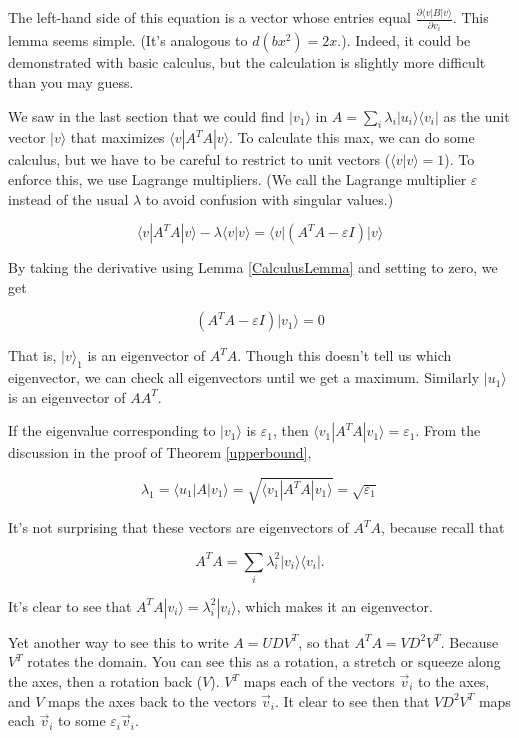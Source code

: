 \documentclass{amsbook}
\begin{document}
The left-hand side of this equation is a vector whose entries equal $\frac{\partial\langle v|B|v\rangle}{\partial v_i}$.  This lemma seems simple.  (It's analogous to $d(bx^2)=2x$.). Indeed, it could be demonstrated with basic calculus, but the calculation is slightly more difficult than you may guess.

We saw in the last section that we could find $|v_1\rangle$ in $A=\sum_i\lambda_i|u_i\rangle\langle v_i|$ as the unit vector $|v\rangle$ that maximizes $\langle v|A^TA|v\rangle$.  To calculate this max, we can do some calculus, but we have to be careful to restrict to unit vectors ($\langle v|v\rangle=1$).  To enforce this, we use Lagrange multipliers.  (We call the Lagrange multiplier $\varepsilon$ instead of the usual $\lambda$ to avoid confusion with singular values.)

$$
\langle v|A^TA|v\rangle-\lambda\langle v|v\rangle=\langle v|\left(A^TA-\varepsilon I\right)|v\rangle
$$

By taking the derivative using Lemma \ref{CalculusLemma} and setting to zero, we get

$$
\left(A^TA-\varepsilon I\right)|v_1\rangle=0
$$

That is, $|v\rangle_1$ is an eigenvector of $A^TA$.  Though this doesn't tell us which eigenvector, we can check all eigenvectors until we get a maximum.  Similarly $|u_1\rangle$ is an eigenvector of $AA^T$.

If the eigenvalue corresponding to $|v_1\rangle$ is $\varepsilon_1$, then $\langle v_1|A^TA|v_1\rangle=\varepsilon_1$.  From the discussion in the proof of Theorem \ref{upperbound},

$$
\lambda_1=\langle u_1|A|v_1\rangle=\sqrt{\langle v_1|A^TA|v_1\rangle}=\sqrt{\varepsilon_1}
$$

It's not surprising that these vectors are eigenvectors of $A^TA$, because recall that 

$$
A^TA=\sum_i\lambda_i^2|v_i\rangle\langle v_i|.
$$

It's clear to see that $A^TA|v_i\rangle=\lambda_i^2|v_i\rangle$, which makes it an eigenvector.

Yet another way to see this to write $A=UDV^T$, so that $A^TA=VD^2V^T$.  Because $V^T$ rotates the domain.  You can see this as a rotation, a stretch or squeeze along the axes, then a rotation back ($V$).  $V^T$ maps each of the vectors $\vec v_i$ to the axes, and $V$ maps the axes back to the vectors $\vec v_i$.  It clear to see then that $VD^2V^T$ maps each $\vec v_i$ to some $\varepsilon_i\vec v_i$.
\end{document}
